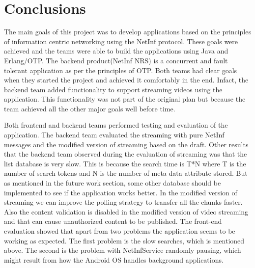 \section{Conclusions}
The main goals of this project was to develop applications based on the principles of information centric networking using the NetInf protocol. These goals were achieved and the teams were able to build the applications using Java and Erlang/OTP. The backend product(NetInf NRS) is a concurrent and fault tolerant application as per the principles of OTP. Both teams had clear goals when they started the project and achieved it comfortably in the end. Infact, the backend team added functionality to support streaming videos using the application. This functionality was not part of the original plan but because the team achieved all the other major goals well before time.

Both frontend and backend teams performed testing and evaluation of the application. The backend team evaluated the streaming with pure NetInf messages and the modified version of streaming based on the draft. Other results that the backend team observed during the evaluation of streaming was that the list database is very slow. This is because the search time is T*N where T is the number of search tokens and N is the number of meta data attribute stored. But as mentioned in the future work section, some other database should be implemented to see if the application works better. In the modified version of streaming we can improve the polling strategy to transfer all the chunks faster. Also the content validation is disabled in the modified version of video streaming and that can cause unauthorized content to be published. The front-end evaluation showed that apart from two problems the application seems to be working as expected. The first problem is the slow searches, which is mentioned above. The second is the problem with NetInfService randomly pausing, which might result from how the Android OS handles background applications.

 
